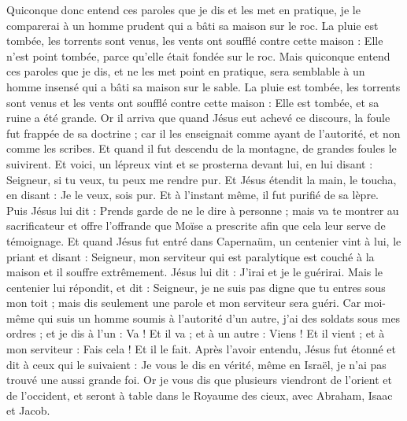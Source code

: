 \begin{multicols}{2}
Quiconque donc entend ces paroles que je dis et les met en pratique, je le comparerai à un homme prudent qui a bâti sa maison sur le roc.
La pluie est tombée, les torrents sont venus, les vents ont soufflé contre cette maison : Elle n'est point tombée, parce qu'elle était fondée sur le roc.
Mais quiconque entend ces paroles que je dis, et ne les met point en pratique, sera semblable à un homme insensé qui a bâti sa maison sur le sable.
La pluie est tombée, les torrents sont venus et les vents ont soufflé contre cette maison : Elle est tombée, et sa ruine a été grande.
Or il arriva que quand Jésus eut achevé ce discours, la foule fut frappée de sa doctrine ;
car il les enseignait comme ayant de l'autorité, et non comme les scribes.
\VerseOne{}Et quand il fut descendu de la montagne, de grandes foules le suivirent.
Et voici, un lépreux vint et se prosterna devant lui, en lui disant : Seigneur, si tu veux, tu peux me rendre pur.
Et Jésus étendit la main, le toucha, en disant : Je le veux, sois pur. Et à l'instant même, il fut purifié de sa lèpre.
Puis Jésus lui dit : Prends garde de ne le dire à personne ; mais va te montrer au sacrificateur et offre l'offrande que Moïse a prescrite afin que cela leur serve de témoignage.
Et quand Jésus fut entré dans Capernaüm, un centenier vint à lui, le priant
et disant : Seigneur, mon serviteur qui est paralytique est couché à la maison et il souffre extrêmement.
Jésus lui dit : J'irai et je le guérirai.
Mais le centenier lui répondit, et dit : Seigneur, je ne suis pas digne que tu entres sous mon toit ; mais dis seulement une parole et mon serviteur sera guéri.
Car moi-même qui suis un homme soumis à l'autorité d'un autre, j'ai des soldats sous mes ordres ; et je dis à l'un : Va ! Et il va ; et à un autre : Viens ! Et il vient ; et à mon serviteur : Fais cela ! Et il le fait.
Après l'avoir entendu, Jésus fut étonné et dit à ceux qui le suivaient : Je vous le dis en vérité, même en Israël, je n'ai pas trouvé une aussi grande foi.
Or je vous dis que plusieurs viendront de l'orient et de l'occident, et seront à table dans le Royaume des cieux, avec Abraham, Isaac et Jacob.

\end{multicols}
